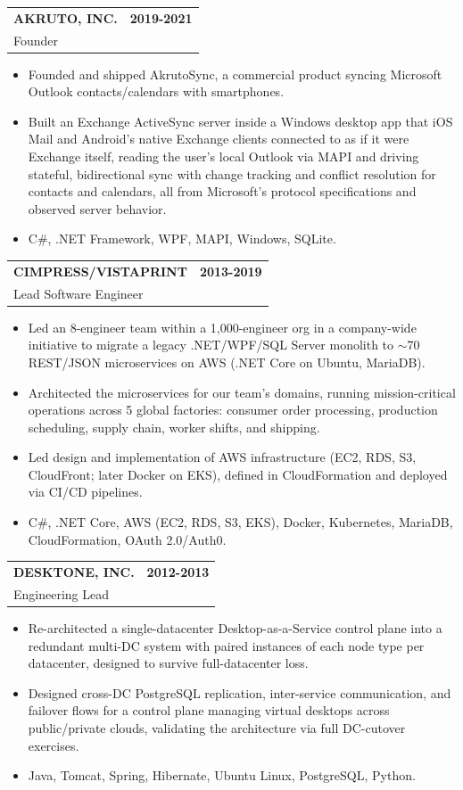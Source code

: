 \documentclass[11pt]{article}
\makeatletter
\newcommand{\IF}[2]{\iftoggle{#1}{#2}{}}
\newcommand{\jobheading}[4]{%
  \vspace{5.6pt}\begin{tabularx}{\textwidth}{@{}X r@{}}
    {\textbf{#1}} & {\textbf{#2}} \\
    {{\normalsize #3}\hspace{0.5em}{\color{muted}·}\hspace{0.5em}{\color{muted}#4}} & {} \\
  \end{tabularx}\vspace{2pt}
}
\makeatother
\begin{document}
\jobheading{AKRUTO, INC.}{2019-2021}{Founder}{Needham, MA}
\begin{itemize}
\item Founded and shipped AkrutoSync, a commercial product syncing Microsoft Outlook contacts/calendars with smartphones.
\item Built an Exchange ActiveSync server inside a Windows desktop app that iOS Mail and Android's native Exchange clients connected to as if it were Exchange itself, reading the user's local Outlook via MAPI and driving stateful, bidirectional sync with change tracking and conflict resolution for contacts and calendars, all from Microsoft's protocol specifications and observed server behavior.
\item C\#, .NET Framework, WPF, MAPI, Windows, SQLite.
\end{itemize}

\jobheading{CIMPRESS/VISTAPRINT}{2013-2019}{Lead Software Engineer}{Waltham, MA}
\begin{itemize}
\item Led an 8-engineer team within a 1,000-engineer org in a company-wide initiative to migrate a legacy .NET/WPF/SQL Server monolith to $\sim$70 REST/JSON microservices on AWS (.NET Core on Ubuntu, MariaDB).
\item Architected the microservices for our team's domains, running mission-critical operations across 5 global factories: consumer order processing, production scheduling, supply chain, worker shifts, and shipping.
\item Led design and implementation of AWS infrastructure (EC2, RDS, S3, CloudFront; later Docker on EKS), defined in CloudFormation and deployed via CI/CD pipelines.
\IF{EMBEDDED}{\item Integrated digital printing presses and embroidery machines via vendor protocols and custom interfaces.}%
\item C\#, .NET Core, AWS (EC2, RDS, S3, EKS), Docker, Kubernetes, MariaDB, CloudFormation, OAuth 2.0/Auth0.
\end{itemize}

\jobheading{DESKTONE, INC.}{2012-2013}{Engineering Lead}{Lexington, MA}
\begin{itemize}
\item Re-architected a single-datacenter Desktop-as-a-Service control plane into a redundant multi-DC system with paired instances of each node type per datacenter, designed to survive full-datacenter loss.
\item Designed cross-DC PostgreSQL replication, inter-service communication, and failover flows for a control plane managing virtual desktops across public/private clouds, validating the architecture via full DC-cutover exercises.
\item Java, Tomcat, Spring, Hibernate, Ubuntu Linux, PostgreSQL, Python.
\end{itemize}
\end{document}
